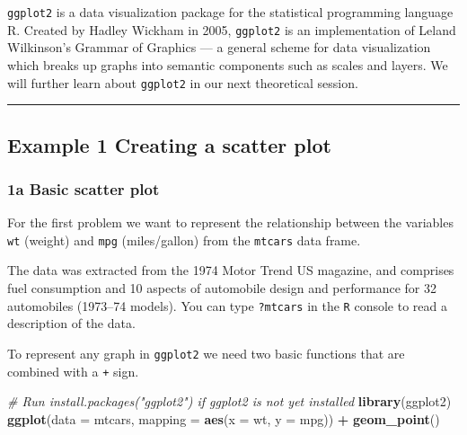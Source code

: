 \documentclass[
]{article}
\newenvironment{Shaded}{\begin{snugshade}}{\end{snugshade}}
\newcommand{\AttributeTok}[1]{\textcolor[rgb]{0.13,0.29,0.53}{#1}}
\newcommand{\CommentTok}[1]{\textcolor[rgb]{0.56,0.35,0.01}{\textit{#1}}}
\newcommand{\FunctionTok}[1]{\textcolor[rgb]{0.13,0.29,0.53}{\textbf{#1}}}
\newcommand{\NormalTok}[1]{#1}
\newcommand{\SpecialCharTok}[1]{\textcolor[rgb]{0.81,0.36,0.00}{\textbf{#1}}}
\begin{document}
\texttt{ggplot2} is a data visualization package for the statistical
programming language R. Created by Hadley Wickham in 2005,
\texttt{ggplot2} is an implementation of Leland Wilkinson's Grammar of
Graphics --- a general scheme for data visualization which breaks up
graphs into semantic components such as scales and layers. We will
further learn about \texttt{ggplot2} in our next theoretical session.

\begin{center}\rule{0.5\linewidth}{0.5pt}\end{center}

\subsection{\texorpdfstring{\textbf{ Example 1} \textbar{} Creating a
scatter
plot}{ Example 1 \textbar{} Creating a scatter plot}}\label{example-1-creating-a-scatter-plot}

\subsubsection{\texorpdfstring{\textbf{1a} \textbar{} Basic scatter
plot}{1a \textbar{} Basic scatter plot}}\label{a-basic-scatter-plot}

For the first problem we want to represent the relationship between the
variables \texttt{wt} (weight) and \texttt{mpg} (miles/gallon) from the
\texttt{mtcars} data frame.

The data was extracted from the 1974 Motor Trend US magazine, and
comprises fuel consumption and 10 aspects of automobile design and
performance for 32 automobiles (1973--74 models). You can type
\texttt{?mtcars} in the \texttt{R} console to read a description of the
data.

To represent any graph in \texttt{ggplot2} we need two basic functions
that are combined with a \texttt{+} sign.

\begin{Shaded}
\begin{Highlighting}[]
\CommentTok{\# Run install.packages("ggplot2") if ggplot2 is not yet installed}
\FunctionTok{library}\NormalTok{(ggplot2)}
\FunctionTok{ggplot}\NormalTok{(}\AttributeTok{data =}\NormalTok{ mtcars, }\AttributeTok{mapping =} \FunctionTok{aes}\NormalTok{(}\AttributeTok{x =}\NormalTok{ wt, }\AttributeTok{y =}\NormalTok{ mpg)) }\SpecialCharTok{+} 
  \FunctionTok{geom\_point}\NormalTok{()}
\end{Highlighting}
\end{Shaded}
\end{document}

